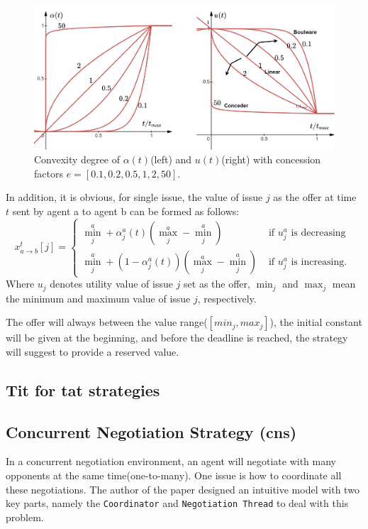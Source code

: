 \begin{figure}
\centering
\includegraphics[width=1.0\textwidth]{./images/conceder-boulware-combination.png}
\caption{Convexity degree of $\alpha(t)$(left) and $u(t)$(right) with concession factors $e=[0.1, 0.2, 0.5, 1, 2, 50]$.}
\label{fig:boulware-conceder-combination}
\end{figure}

In addition, it is obvious, for single issue, the value of issue $j$ as the offer at time $t$ sent by agent a to agent b can be formed as follows:
\begin{equation}
x_{a \rightarrow b}^{t}[j]=\left\{\begin{array}{ll}
\min _{j}^{a}+\alpha_{j}^{a}(t)\left(\max _{j}^{a}-\min _{j}^{a}\right) & \text { if } u_{j}^{a} \text { is decreasing } \\
\min _{j}^{a}+\left(1-\alpha_{j}^{a}(t)\right)\left(\max _{j}^{a}-\min _{j}^{a}\right) & \text { if } u_{j}^{a} \text { is increasing. }
\end{array}\right.
\end{equation}
Where $u_{j}$ denotes utility value of issue $j$ set as the offer, $\min _{j}$ and $\max _{j}$ mean the minimum and maximum value of issue $j$, respectively.


The offer will always between the value range($[min_j, max_j]$), the initial constant will be given at the beginning, and before the deadline is reached, the strategy will suggest to provide a reserved value.

\subsection{Tit for tat strategies}

\subsection{Concurrent Negotiation Strategy (\gls{cns})}
In a concurrent negotiation environment, an agent will negotiate with many opponents at the same time(one-to-many). One issue is how to coordinate all these negotiations. The author of the paper \parencite{Williams12Concurrent} designed an intuitive model with two key parts, namely the \texttt{Coordinator} and \texttt{Negotiation Thread} to deal with this problem.

